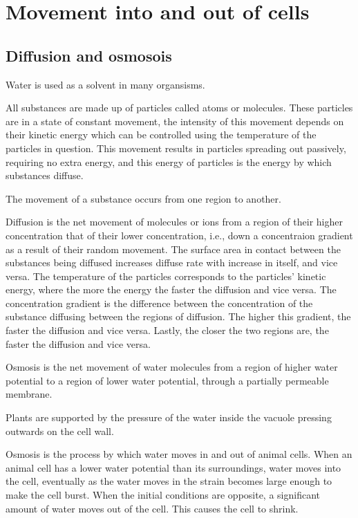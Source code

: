\section{Movement into and out of cells}
\subsection{Diffusion and osmosois}

Water is used as a solvent in many organsisms.

All substances are made up of particles called atoms or molecules. These particles are in a state
of constant movement, the intensity of this movement depends on their kinetic energy which can
be controlled using the temperature of the particles in question. This movement results in particles
spreading out passively, requiring no extra energy, and this energy of particles is the energy
by which substances diffuse.

The movement of a substance occurs from one region to another.

Diffusion is the net movement of molecules or ions from a region of their higher concentration
that of their lower concentration, i.e., down a concentraion gradient as a result of their random
movement. The surface area in contact between the substances being diffused increases diffuse rate
with increase in itself, and vice versa. The temperature of the particles corresponds to the 
particles' kinetic energy, where the more the energy the faster the diffusion and vice versa.
The concentration gradient is the difference between the concentration of the substance diffusing
between the regions of diffusion. The higher this gradient, the faster the diffusion and vice
versa. Lastly, the closer the two regions are, the faster the diffusion and vice versa.

Osmosis is the net movement of water molecules from a region of higher water potential to a region
of lower water potential, through a partially permeable membrane.

Plants are supported by the pressure of the water inside the vacuole pressing outwards on the cell
wall.

Osmosis is the process by which water moves in and out of animal cells. When an animal cell has
a lower water potential than its surroundings, water moves into the cell, eventually as the water
moves in the strain becomes large enough to make the cell burst. When the initial conditions are
opposite, a significant amount of water moves out of the cell. This causes the cell to shrink.


